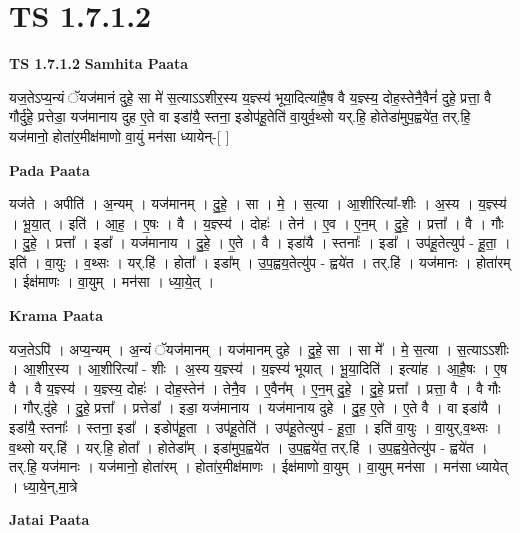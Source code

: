 \documentclass[17pt]{extarticle}
\begin{document}
\section{ TS 1.7.1.2 }

\textbf{TS 1.7.1.2 } \newline
\textbf{Samhita Paata} \newline

यज॒तेऽप्य॒न्यं ॅयज॑मानं दुहे॒ सा मे॑ स॒त्याऽऽशीर॒स्य य॒ज्ञ्स्य॑ भूया॒दित्या॑है॒ष वै य॒ज्ञ्स्य॒ दोह॒स्तेनै॒वैनं॑ दुहे॒ प्रत्ता॒ वै गौर्दु॑हे॒ प्रत्तेडा॒ यज॑मानाय दुह ए॒ते वा इडा॑यै॒ स्तना॒ इडोप॑हू॒तेति॑ वा॒युर्व॒थ्सो यर्.हि॒ होतेडा॑मुप॒ह्वये॑त॒ तर्.हि॒ यज॑मानो॒ होता॑र॒मीक्ष॑माणो वा॒युं मन॑सा ध्यायेन्-[ ] \newline

\textbf{Pada Paata} \newline

यज॑ते । अपीति॑ । अ॒न्यम् । यज॑मानम् । दु॒हे॒ । सा । मे॒ । स॒त्या । आ॒शीरित्या᳚-शीः । अ॒स्य । य॒ज्ञ्स्य॑ । भू॒या॒त् । इति॑ । आ॒ह॒ । ए॒षः । वै । य॒ज्ञ्स्य॑ । दोहः॑ । तेन॑ । ए॒व । ए॒न॒म् । दु॒हे॒ । प्रत्ता᳚ । वै । गौः । दु॒हे॒ । प्रत्ता᳚ । इडा᳚ । यज॑मानाय । दु॒हे॒ । ए॒ते । वै । इडा॑यै । स्तनाः᳚ । इडा᳚ । उप॑हू॒तेत्युप॑ - हू॒ता॒ । इति॑ । वा॒युः । व॒थ्सः । यर्.हि॑ । होता᳚ । इडा᳚म् । उ॒प॒ह्वय॒तेत्यु॑प - ह्वये॑त । तर्.हि॑ । यज॑मानः । होता॑रम् । ईक्ष॑माणः । वा॒युम् । मन॑सा । ध्या॒ये॒त् ।  \newline


\textbf{Krama Paata} \newline

यज॒तेऽपि॑ । अप्य॒न्यम् । अ॒न्यं ॅयज॑मानम् । यज॑मानम् दुहे । दु॒हे॒ सा । सा मे᳚ । मे॒ स॒त्या । स॒त्याऽऽशीः । आ॒शीर॒स्य । आ॒शीरित्या᳚ - शीः । अ॒स्य य॒ज्ञ्स्य॑ । य॒ज्ञ्स्य॑ भूयात् । भू॒या॒दिति॑ । इत्या॑ह । आ॒है॒षः । ए॒ष वै । वै य॒ज्ञ्स्य॑ । य॒ज्ञ्स्य॒ दोहः॑ । दोह॒स्तेन॑ । तेनै॒व । ए॒वैन᳚म् । ए॒न॒म् दु॒हे॒ । दु॒हे॒ प्रत्ता᳚ । प्रत्ता॒ वै । वै गौः । गौर्,दु॑हे । दु॒हे॒ प्रत्ता᳚ । प्रत्तेडा᳚ । इडा॒ यज॑मानाय । यज॑मानाय दुहे । दु॒ह॒ ए॒ते । ए॒ते वै । वा इडा॑यै । इडा॑यै॒ स्तनाः᳚ । स्तना॒ इडा᳚ । इडोप॑हू॒ता । उप॑हू॒तेति॑ । उप॑हू॒तेत्युप॑ - हू॒ता॒ । इति॑ वा॒युः । वा॒युर्,व॒थ्सः । व॒थ्सो यर्.हि॑ । यर्.हि॒ होता᳚ । होतेडा᳚म् । इडा॑मुप॒ह्वये॑त । उ॒प॒ह्वये॑त॒ तर्.हि॑ । उ॒प॒ह्वये॒तेत्यु॑प - ह्वये॑त । तर्.हि॒ यज॑मानः । यज॑मानो॒ होता॑रम् । होता॑र॒मीक्ष॑माणः । ईक्ष॑माणो वा॒युम् । वा॒युम् मन॑सा । मन॑सा ध्यायेत् । ध्या॒ये॒न्,मा॒त्रे \newline

\textbf{Jatai Paata} \newline
\end{document}
